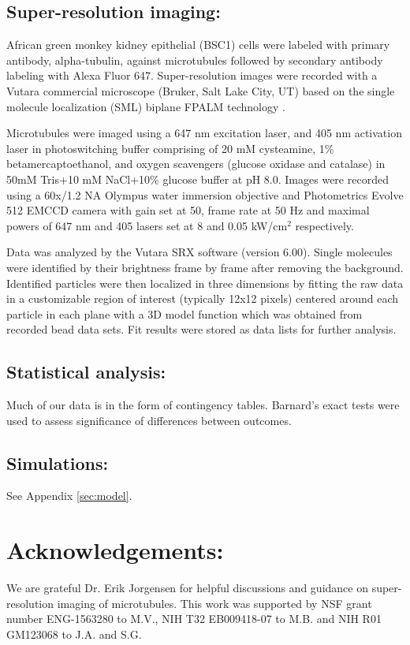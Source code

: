 \subsection{Super-resolution imaging:}

African green monkey kidney epithelial (BSC1) cells were labeled with primary antibody, alpha-tubulin, against microtubules followed by secondary antibody labeling with Alexa Fluor 647. Super-resolution images were recorded with a Vutara commercial microscope (Bruker, Salt Lake City, UT) based on the single molecule localization (SML) biplane FPALM technology \cite{Juette2008,Mlodzianoski2009}.

Microtubules were imaged using a 647 nm excitation laser, and 405 nm activation laser in photoswitching buffer comprising of 20 mM cysteamine, 1\% betamercaptoethanol, and oxygen scavengers (glucose oxidase and catalase) in 50mM Tris+10 mM NaCl+10\% glucose buffer at pH 8.0. Images were recorded using a 60x/1.2 NA Olympus water immersion objective and Photometrics Evolve 512 EMCCD camera with gain set at 50, frame rate at 50 Hz and maximal powers of 647 nm and 405 lasers set at 8 and 0.05 kW/cm$^2$ respectively.

Data was analyzed by the Vutara SRX software (version 6.00). Single molecules were identified by their brightness frame by frame after removing the background. Identified particles were then localized in three dimensions by fitting the raw data in a customizable region of interest (typically 12x12 pixels) centered around each particle in each plane with a 3D model function which was obtained from recorded bead data sets. Fit results were stored as data lists for further analysis.

\subsection{Statistical analysis:}

Much of our data is in the form of contingency tables. Barnard's exact tests were used to assess significance of differences between outcomes.

\subsection{Simulations:}

See Appendix \ref{sec:model}.

\section{Acknowledgements:}

We are grateful Dr. Erik Jorgensen for helpful discussions and guidance on super-resolution imaging of microtubules. This work was supported by NSF grant number ENG-1563280 to M.V., NIH T32 EB009418-07 to M.B. and NIH R01 GM123068 to J.A. and S.G.